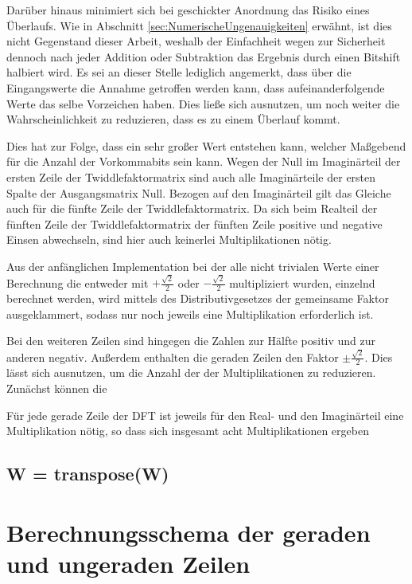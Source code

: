  
 Darüber hinaus
 minimiert sich bei geschickter Anordnung das Risiko eines Überlaufs. Wie in Abschnitt \ref{sec:NumerischeUngenauigkeiten} erwähnt, ist dies nicht Gegenstand dieser Arbeit,
 weshalb der Einfachheit wegen zur Sicherheit dennoch nach jeder Addition oder Subtraktion das Ergebnis durch einen Bitshift halbiert wird. 
 Es sei an dieser Stelle lediglich angemerkt, dass über die Eingangswerte die Annahme getroffen werden kann, dass aufeinanderfolgende Werte das selbe Vorzeichen haben. 
 Dies ließe sich ausnutzen, um noch weiter die Wahrscheinlichkeit zu reduzieren, dass es zu einem Überlauf kommt. 
 

 




Dies hat zur Folge, dass ein sehr großer Wert entstehen kann, welcher Maßgebend für die Anzahl der Vorkommabits sein kann.
%
Wegen der Null im Imaginärteil der ersten Zeile der Twiddlefaktormatrix sind auch alle Imaginärteile der ersten Spalte der Ausgangsmatrix Null.
Bezogen auf den Imaginärteil gilt das Gleiche auch für die fünfte Zeile der Twiddlefaktormatrix. 
%
Da sich beim Realteil der fünften Zeile der Twiddlefaktormatrix der fünften Zeile positive und negative Einsen abwechseln, sind hier auch keinerlei Multiplikationen nötig.

Aus der anfänglichen Implementation bei der alle nicht trivialen Werte einer Berechnung die entweder mit $+\frac{\sqrt{2}}{2}$ oder $-\frac{\sqrt{2}}{2}$ multipliziert wurden,
einzelnd berechnet werden, wird mittels des Distributivgesetzes der gemeinsame Faktor ausgeklammert, sodass nur noch jeweils eine Multiplikation erforderlich ist.


Bei den weiteren Zeilen sind hingegen die Zahlen zur Hälfte positiv und zur anderen negativ. Außerdem enthalten die geraden Zeilen den Faktor $\pm\frac{\sqrt{2}}{2}$. 
Dies lässt sich ausnutzen, um die Anzahl der der Multiplikationen zu reduzieren. Zunächst können die 

Für jede gerade Zeile der DFT ist jeweils für den Real- und den Imaginärteil eine Multiplikation nötig, so dass sich insgesamt acht Multiplikationen ergeben
 
\subsection{W = transpose(W)}
 
 
\section{Berechnungsschema der geraden und ungeraden Zeilen}\label{sec:Berechnungsschema}

